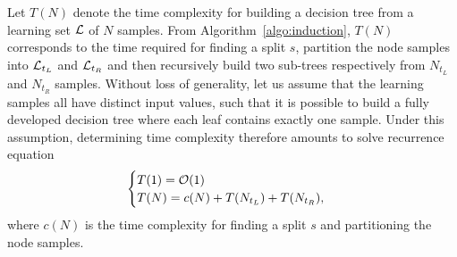 Let $T(N)$ denote the time complexity for building a decision tree from a
learning set ${\cal L}$ of $N$ samples. From Algorithm~\ref{algo:induction},
$T(N)$ corresponds to the time required for finding a split $s$, partition the
node samples into ${\cal L}_{t_L}$ and ${\cal L}_{t_R}$ and then recursively
build two sub-trees respectively from $N_{t_L}$ and $N_{t_R}$ samples. Without
loss of generality, let us assume that the learning samples all have distinct
input values, such that it is possible to build a fully developed decision tree
where each leaf contains exactly one sample. Under this assumption, determining
time complexity therefore amounts to solve recurrence equation
\begin{equation}
\begin{cases}
T(1) = {\cal O}(1) \\
T(N) = c(N) + T(N_{t_L}) + T(N_{t_R}),
\end{cases}
\end{equation}
where $c(N)$ is the time complexity for finding a split $s$ and partitioning
the node samples.







